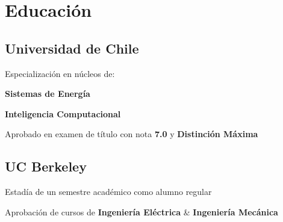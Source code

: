 \section{Educación \faGraduationCap{}}

\subsection{Universidad de Chile}
Especialización en núcleos de:
\vspace{\topsep} 
\begin{tightemize}
\item \textbf{Sistemas de Energía}
\item \textbf{Inteligencia Computacional}
\end{tightemize}
Aprobado en examen de título con nota \textbf{7.0} y \textbf{Distinción Máxima}
\sectionsep

\subsection{UC Berkeley}
Estadía de un semestre académico como alumno regular
\begin{tightemize}
\item Aprobación de cursos de \textbf{Ingeniería Eléctrica} \& \textbf{Ingeniería Mecánica}
\end{tightemize}

\sectionsep

